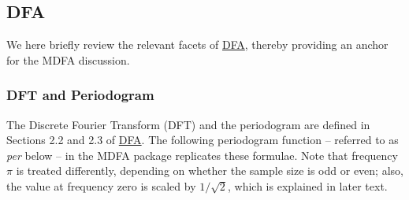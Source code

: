 \documentclass[a4paper]{book}
\begin{document}
\subsection{DFA}\label{dfa_intro}
We here briefly review the relevant facets of \href{http://blog.zhaw.ch/sef/files/2014/10/DFA.pdf}{DFA},
 thereby providing an anchor for the MDFA discussion. 

\subsubsection{DFT and Periodogram}

The Discrete Fourier Transform (DFT) and the periodogram are defined in Sections 2.2 and 2.3 of
\href{http://blog.zhaw.ch/sef/files/2014/10/DFA.pdf}{DFA}.  
The following periodogram function -- referred to as {\em per} below --
  in the MDFA package replicates these formulae.  Note that frequency $\pi$ is treated differently, depending on
 whether the  sample size is odd or even; also, the value at frequency zero is scaled by $1/\sqrt{2}$,
  which  is explained in later text.  
\end{document}
